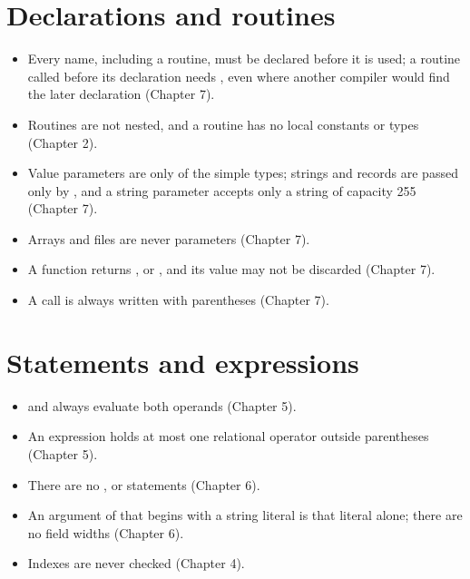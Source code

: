 \section{Declarations and routines}
\begin{itemize}
\item Every name, including a routine, must be declared before it is used;
  a routine called before its declaration needs , even where
  another compiler would find the later declaration (Chapter 7).
\item Routines are not nested, and a routine has no local constants or
  types (Chapter 2).
\item Value parameters are only of the simple types; strings and records are
  passed only by , and a  string parameter accepts only a
  string of capacity 255 (Chapter 7).
\item Arrays and files are never parameters (Chapter 7).
\item A function returns ,  or , and its
  value may not be discarded (Chapter 7).
\item A call is always written with parentheses (Chapter 7).
\end{itemize}

\section{Statements and expressions}
\begin{itemize}
\item {} and  always evaluate both operands (Chapter 5).
\item An expression holds at most one relational operator outside
  parentheses (Chapter 5).
\item There are no ,  or  statements
  (Chapter 6).
\item An argument of  that begins with a string literal is
  that literal alone; there are no field widths (Chapter 6).
\item Indexes are never checked (Chapter 4).
\end{itemize}

